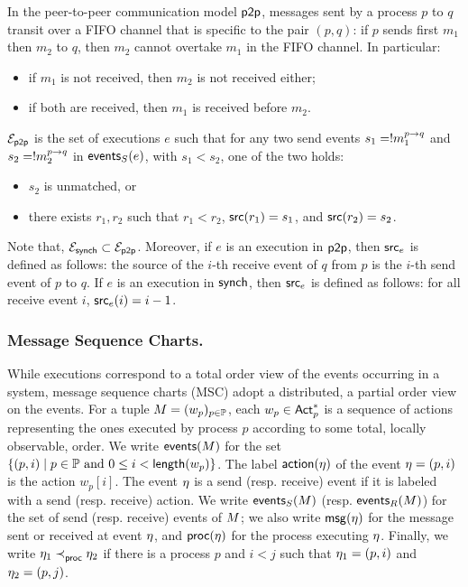 In the peer-to-peer communication model $\ppmodel$, messages sent by a process $p$ to $q$ transit over a FIFO channel
that is specific to the pair $(p,q)$: if $p$ sends first $m_1$ then $m_2$ to $q$, 
then $m_2$ cannot overtake $m_1$ in the FIFO channel. In particular:
\begin{itemize}
	\item if $m_1$ is not received, then $m_2$ is not received either;
	\item if both are received, then $m_1$ is received before $m_2$.
\end{itemize}
      
\begin{definition}\label{def:queue-based-communication-model}
	$\executionsofmodel{\ppmodel}$  is
	the set of executions $e$ such that for any two send events $s_1=\send{p}{q}{\msg_1}$ and 
	$s_2=\send{p}{q}{\msg_2}$ in $\sendeventsof{e}$, 
	with $s_1 < s_2$,
	one of the two holds:
	\begin{itemize}
		\item $s_2$ is unmatched, or
		\item there exists $r_1,r_2$ such that $r_1<r_2$, $\source(r_1)=s_1$, and $\source(r_2)=s_2$.
	\end{itemize}
\end{definition}

Note that, $\executionsofmodel{\synchmodel}\subset\executionsofmodel{\ppmodel}$.
Moreover, if $e$ is an execution in $\ppmodel$, then  $\source_e$ is defined as follows:
the source of the $i$-th receive event of $q$ from $p$ is the $i$-th send event of $p$ to $q$.
If $e$ is an execution in $\synchmodel$, then $\source_e$ is defined as follows: 
for all receive event $i$, $\source_{e}(i)=i-1$.


\subsubsection*{Message Sequence Charts.}
While executions correspond to a total order view of the events occurring in a 
system, message sequence charts (MSC) adopt a distributed, a partial order view on the events.
For a tuple $\msc=(w_p)_{p\in\Procs}$, each $w_p\in\Actsp$ 
is a sequence of actions representing  the ones executed by process $p$ according to some total, locally observable, order.
We write $\eventsof{\msc}$  for the set $\{(p,i) \mid p \in \Procs \text{ and } 0 \leq i < \length{w_p}\}$.
The label $\actionof{\event}$ of the event $\event=(p,i)$ is the action $w_p[i]$. The event $\event$
is a send (resp. receive) event if it is labeled with a send (resp. receive) action.
We write $\sendeventsof{\msc}$ (resp. $\receiveeventsof{\msc}$) for the set of send (resp. receive) events of $\msc$; we also write $\messageof{\event}$ for the message sent or received at event $\event$, and 
$\processof{\event}$ for the process executing $\event$. Finally, we write 
$\verticalorderstrict{\event_1}{\event_2}$ if there is a process $p$ and $i<j$ such that
$\event_1=(p,i)$ and $\event_2=(p,j)$.

